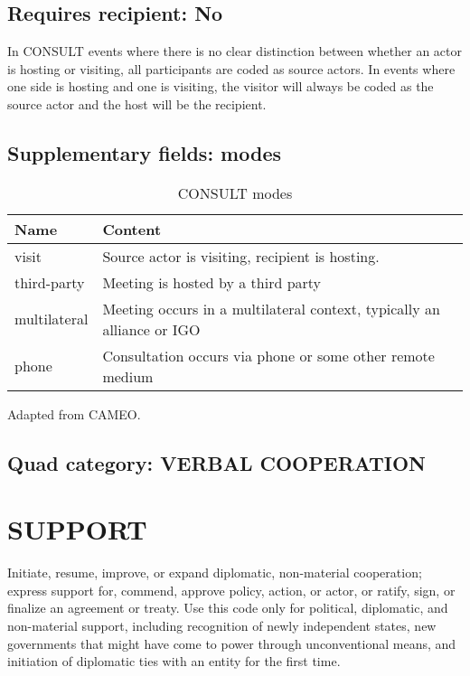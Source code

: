 \documentclass[11pt]{report}
\newcommand{\plcat}[1]{\textsf{#1}}
\begin{document}
\subsection{Requires recipient: No}

In \plcat{CONSULT} events where there is no clear distinction between whether an actor is hosting or visiting, all participants are coded as source actors. In events where one side is hosting and one is visiting, the visitor will always be coded as the source actor and the host will be the recipient.

\subsection{Supplementary fields: modes}

\begin{table}[htp]
\caption{CONSULT modes}
\begin{center}
\begin{tabular}{|l|p{13cm}|}
\hline
Name & Content \\
\hline
visit & Source actor is visiting, recipient is hosting.\\
third-party & Meeting is hosted by a third party\\
multilateral & Meeting occurs in a multilateral context, typically an alliance or IGO\\
phone & Consultation occurs via phone or some other remote medium\\
\hline
\end{tabular}
\end{center}
\label{tab:consultmode}
Adapted from CAMEO.
\end{table}%

\subsection{Quad category: VERBAL COOPERATION}


\newpage

\section{SUPPORT}

Initiate, resume, improve, or expand diplomatic, non-material cooperation; express support for, commend, approve policy, action, or actor, or ratify, sign, or finalize an agreement or treaty. Use this code only for political, diplomatic, and non-material support, including recognition of newly independent states, new governments that might have come to power through unconventional means, and initiation of diplomatic ties with an entity for the first time. 
\end{document}
